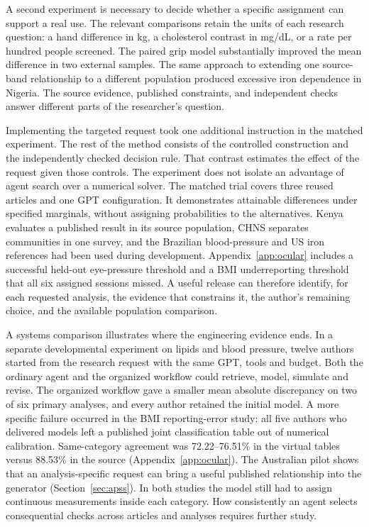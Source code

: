 \documentclass[sigconf,anonymous,review]{acmart}
\begin{document}
A second experiment is necessary to decide whether a specific assignment can support a real use. The relevant comparisons retain the units of each research question: a hand difference in kg, a cholesterol contrast in mg/dL, or a rate per hundred people screened. The paired grip model substantially improved the mean difference in two external samples. The same approach to extending one source-band relationship to a different population produced excessive iron dependence in Nigeria. The source evidence, published constraints, and independent checks answer different parts of the researcher's question.

Implementing the targeted request took one additional instruction in the matched experiment. The rest of the method consists of the controlled construction and the independently checked decision rule. That contrast estimates the effect of the request given those controls. The experiment does not isolate an advantage of agent search over a numerical solver. The matched trial covers three reused articles and one GPT configuration. It demonstrates attainable differences under specified marginals, without assigning probabilities to the alternatives. Kenya evaluates a published result in its source population, CHNS separates communities in one survey, and the Brazilian blood-pressure and US iron references had been used during development. Appendix~\ref{app:ocular} includes a successful held-out eye-pressure threshold and a BMI underreporting threshold that all six assigned sessions missed. A useful release can therefore identify, for each requested analysis, the evidence that constrains it, the author's remaining choice, and the available population comparison.

A systems comparison illustrates where the engineering evidence ends. In a separate developmental experiment on lipids and blood pressure, twelve authors started from the research request with the same GPT, tools and budget. Both the ordinary agent and the organized workflow could retrieve, model, simulate and revise. The organized workflow gave a smaller mean absolute discrepancy on two of six primary analyses, and every author retained the initial model. A more specific failure occurred in the BMI reporting-error study: all five authors who delivered models left a published joint classification table out of numerical calibration. Same-category agreement was 72.22--76.51\% in the virtual tables versus 88.53\% in the source (Appendix~\ref{app:ocular}). The Australian pilot shows that an analysis-specific request can bring a useful published relationship into the generator (Section~\ref{sec:apss}). In both studies the model still had to assign continuous measurements inside each category. How consistently an agent selects consequential checks across articles and analyses requires further study.


\clearpage
\appendix

\end{document}
